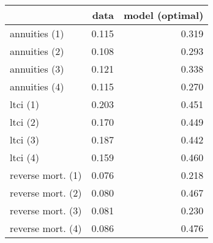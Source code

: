 \begin{tabular}{lrr}
\toprule
{} &   data &  model (optimal) \\
\midrule
annuities (1)     &  0.115 &            0.319 \\
annuities (2)     &  0.108 &            0.293 \\
annuities (3)     &  0.121 &            0.338 \\
annuities (4)     &  0.115 &            0.270 \\
ltci (1)          &  0.203 &            0.451 \\
ltci (2)          &  0.170 &            0.449 \\
ltci (3)          &  0.187 &            0.442 \\
ltci (4)          &  0.159 &            0.460 \\
reverse mort. (1) &  0.076 &            0.218 \\
reverse mort. (2) &  0.080 &            0.467 \\
reverse mort. (3) &  0.081 &            0.230 \\
reverse mort. (4) &  0.086 &            0.476 \\
\bottomrule
\end{tabular}
